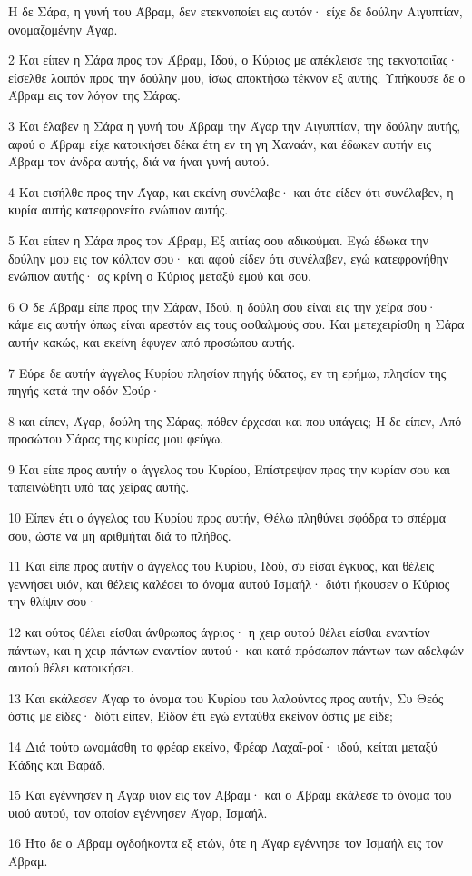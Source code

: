 \par Η δε Σάρα, η γυνή του Άβραμ, δεν ετεκνοποίει εις αυτόν· είχε δε δούλην Αιγυπτίαν, ονομαζομένην Άγαρ.
\par 2 Και είπεν η Σάρα προς τον Άβραμ, Ιδού, ο Κύριος με απέκλεισε της τεκνοποιΐας· είσελθε λοιπόν προς την δούλην μου, ίσως αποκτήσω τέκνον εξ αυτής. Υπήκουσε δε ο Άβραμ εις τον λόγον της Σάρας.
\par 3 Και έλαβεν η Σάρα η γυνή του Άβραμ την Άγαρ την Αιγυπτίαν, την δούλην αυτής, αφού ο Άβραμ είχε κατοικήσει δέκα έτη εν τη γη Χαναάν, και έδωκεν αυτήν εις Άβραμ τον άνδρα αυτής, διά να ήναι γυνή αυτού.
\par 4 Και εισήλθε προς την Άγαρ, και εκείνη συνέλαβε· και ότε είδεν ότι συνέλαβεν, η κυρία αυτής κατεφρονείτο ενώπιον αυτής.
\par 5 Και είπεν η Σάρα προς τον Άβραμ, Εξ αιτίας σου αδικούμαι. Εγώ έδωκα την δούλην μου εις τον κόλπον σου· και αφού είδεν ότι συνέλαβεν, εγώ κατεφρονήθην ενώπιον αυτής· ας κρίνη ο Κύριος μεταξύ εμού και σου.
\par 6 Ο δε Άβραμ είπε προς την Σάραν, Ιδού, η δούλη σου είναι εις την χείρα σου· κάμε εις αυτήν όπως είναι αρεστόν εις τους οφθαλμούς σου. Και μετεχειρίσθη η Σάρα αυτήν κακώς, και εκείνη έφυγεν από προσώπου αυτής.
\par 7 Εύρε δε αυτήν άγγελος Κυρίου πλησίον πηγής ύδατος, εν τη ερήμω, πλησίον της πηγής κατά την οδόν Σούρ·
\par 8 και είπεν, Άγαρ, δούλη της Σάρας, πόθεν έρχεσαι και που υπάγεις; Η δε είπεν, Από προσώπου Σάρας της κυρίας μου φεύγω.
\par 9 Και είπε προς αυτήν ο άγγελος του Κυρίου, Επίστρεψον προς την κυρίαν σου και ταπεινώθητι υπό τας χείρας αυτής.
\par 10 Είπεν έτι ο άγγελος του Κυρίου προς αυτήν, Θέλω πληθύνει σφόδρα το σπέρμα σου, ώστε να μη αριθμήται διά το πλήθος.
\par 11 Και είπε προς αυτήν ο άγγελος του Κυρίου, Ιδού, συ είσαι έγκυος, και θέλεις γεννήσει υιόν, και θέλεις καλέσει το όνομα αυτού Ισμαήλ· διότι ήκουσεν ο Κύριος την θλίψιν σου·
\par 12 και ούτος θέλει είσθαι άνθρωπος άγριος· η χειρ αυτού θέλει είσθαι εναντίον πάντων, και η χειρ πάντων εναντίον αυτού· και κατά πρόσωπον πάντων των αδελφών αυτού θέλει κατοικήσει.
\par 13 Και εκάλεσεν Άγαρ το όνομα του Κυρίου του λαλούντος προς αυτήν, Συ Θεός όστις με είδες· διότι είπεν, Είδον έτι εγώ ενταύθα εκείνον όστις με είδε;
\par 14 Διά τούτο ωνομάσθη το φρέαρ εκείνο, Φρέαρ Λαχαΐ-ροΐ· ιδού, κείται μεταξύ Κάδης και Βαράδ.
\par 15 Και εγέννησεν η Άγαρ υιόν εις τον Αβραμ· και ο Άβραμ εκάλεσε το όνομα του υιού αυτού, τον οποίον εγέννησεν Άγαρ, Ισμαήλ.
\par 16 Ήτο δε ο Άβραμ ογδοήκοντα εξ ετών, ότε η Άγαρ εγέννησε τον Ισμαήλ εις τον Άβραμ.

